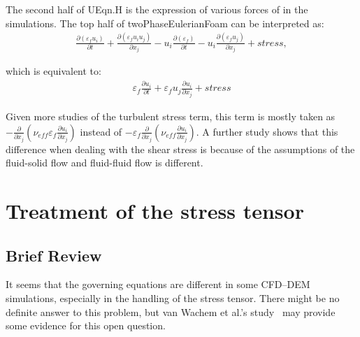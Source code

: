 \documentclass[11pt]{article}
\begin{document}
The second half of UEqn.H is the expression of various forces of in the simulations. The top half
of twoPhaseEulerianFoam can be interpreted as:
\begin{equation}
    \begin{split}
      \frac{\partial (\varepsilon_f u_i)}{\partial t}
      + \frac{\partial (\varepsilon_f u_i u_j)}{\partial x_j}
      - u_i \frac{\partial (\varepsilon_f)}{\partial t}
      - u_i \frac{\partial (\varepsilon_f u_j)}{\partial x_j}
      + stress,
    \end{split}
\label{eqn:twoPhase-1}
\end{equation}

which is equivalent to:
\begin{equation}
    \begin{split}
      \varepsilon_f \frac{\partial u_i}{\partial t}
      + \varepsilon_f u_j \frac{\partial u_i}{\partial x_j}
      + stress
    \end{split}
\label{eqn:twoPhase-2}
\end{equation}

Given more studies of the turbulent stress term, this term is mostly taken as
$-\frac{\partial}{\partial x_j}\left(\nu_{eff} \varepsilon_f \frac{\partial u_i}{\partial
x_j}\right)$ instead of $-\varepsilon_f \frac{\partial}{\partial x_j}\left(\nu_{eff} \frac{\partial
u_i}{\partial x_j}\right)$. A further study shows that this difference when dealing with the shear
stress is because of the assumptions of the fluid-solid flow and fluid-fluid flow is different.

\section{Treatment of the stress tensor}

\subsection{Brief Review}

  It seems that the governing equations are different in some CFD--DEM simulations, especially in
  the handling of the stress tensor. There might be no definite answer to this problem, but
  van Wachem et al.'s study~\cite{wachem03mf} may provide some evidence for this open question.
\end{document}
